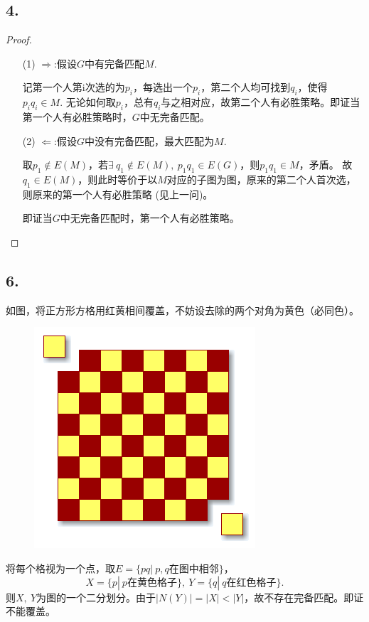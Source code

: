 \documentclass{article}
\begin{document}
\subsection*{4.}
\begin{proof}
    \begin{enumerate}
        \item []
        \item [(1)]$\Rightarrow$:假设$G$中有完备匹配$M$.
        
        记第一个人第i次选的为$p_i$，每选出一个$p_i$，第二个人均可找到$q_i$，使得$p_i q_i\in M$.
        无论如何取$p_i$，总有$q_i$与之相对应，故第二个人有必胜策略。即证当第一个人有必胜策略时，$G$中无完备匹配。
        \item [(2)]$\Leftarrow$:假设$G$中没有完备匹配，最大匹配为$M$.
        
        取$p_1\notin E(M)$，若$\exists\ q_1\notin E(M),\ p_1 q_1\in E(G)$，则$p_1 q_1\in M$，矛盾。
        故$q_1\in E(M)$，则此时等价于以$M$对应的子图为图，原来的第二个人首次选，则原来的第一个人有必胜策略 (见上一问)。

        即证当$G$中无完备匹配时，第一个人有必胜策略。
    \end{enumerate}
\end{proof}
\clearpage
\subsection*{6.}
如图，将正方形方格用红黄相间覆盖，不妨设去除的两个对角为黄色（必同色）。
\begin{figure}[htbp]
    \centering
    \includegraphics[scale=0.3]{t62.png}
\end{figure}

将每个格视为一个点，取$E=\{pq|\ p,q\mbox{在图中相邻} \}$，
\[
    X=\{p|\ p\mbox{在黄色格子}\},\ Y=\{q|\ q\mbox{在红色格子} \}.
\]
则$X,\ Y$为图的一个二分划分。由于$|N(Y)|=|X|<|Y|$，故不存在完备匹配。即证不能覆盖。
\end{document}
